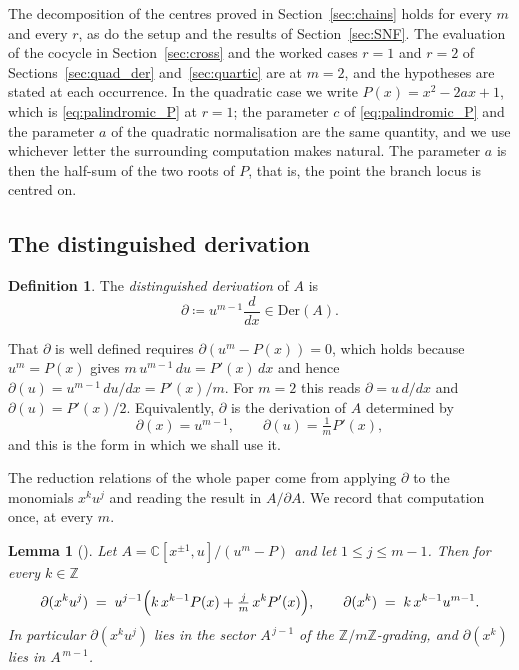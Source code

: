 \documentclass[11pt]{amsart}
\newtheorem{lemma}[theorem]{Lemma}
\theoremstyle{definition}
\newtheorem{definition}[theorem]{Definition}
\theoremstyle{remark}
\newcommand{\C}{\mathbb{C}}
\newcommand{\Z}{\mathbb{Z}}
\newcommand{\Der}{\mathrm{Der}}
\newcommand{\pa}{\partial}
\begin{document}
The decomposition of the centres proved in Section~\ref{sec:chains} holds
for every $m$ and every $r$, as do the setup and the results of
Section~\ref{sec:SNF}. The evaluation of the cocycle in
Section~\ref{sec:cross} and the worked cases $r=1$ and $r=2$ of
Sections~\ref{sec:quad_der} and~\ref{sec:quartic} are at $m=2$, and the
hypotheses are stated at each occurrence. In the quadratic case we write $P(x)=x^2-2ax+1$, which is
\eqref{eq:palindromic_P} at $r=1$; the parameter $c$ of
\eqref{eq:palindromic_P} and the parameter $a$ of the quadratic normalisation
are the same quantity, and we use whichever letter the surrounding computation
makes natural. The parameter $a$ is then the half-sum of the two roots of $P$, that is,
the point the branch locus is centred on.

\subsection{The distinguished derivation}

\begin{definition}\label{def:partial}
The \emph{distinguished derivation} of $A$ is
\[
  \pa \coloneqq u^{m-1}\frac{d}{dx}\in\Der(A).
\]
\end{definition}

That $\pa$ is well defined requires $\pa(u^m-P(x))=0$, which holds because
$u^m=P(x)$ gives $m\,u^{m-1}\,du = P'(x)\,dx$ and hence
$\pa(u)=u^{m-1}\,du/dx = P'(x)/m$. For $m=2$ this reads $\pa=u\,d/dx$ and
$\pa(u)=P'(x)/2$. Equivalently, $\pa$ is the derivation of $A$ determined by
\begin{equation}\label{eq:partial_values}
  \pa(x)=u^{m-1},\qquad \pa(u)=\tfrac1m P'(x),
\end{equation}
and this is the form in which we shall use it.

The reduction relations of the whole paper come from applying $\pa$ to the
monomials $x^ku^j$ and reading the result in $A/\pa A$. We record that
computation once, at every $m$.

\begin{lemma}[{\cite[(3.1)--(3.2)]{CoxGuoLuZhao2017}}]\label{lem:partial_general}
Let $A=\C[x^{\pm1},u]/(u^m-P)$ and let $1\leq j\leq m-1$. Then for every
$k\in\Z$
\begin{equation}\label{eq:partial_general}
  \pa(x^ku^j) \;=\; u^{j-1}\Bigl(k\,x^{k-1}P(x) + \tfrac{j}{m}\,x^kP'(x)\Bigr),
  \qquad
  \pa(x^k) \;=\; k\,x^{k-1}u^{m-1} .
\end{equation}
In particular $\pa(x^ku^j)$ lies in the sector $A^{\,j-1}$ of the
$\Z/m\Z$-grading, and $\pa(x^k)$ lies in $A^{\,m-1}$.
\end{lemma}
\end{document}
